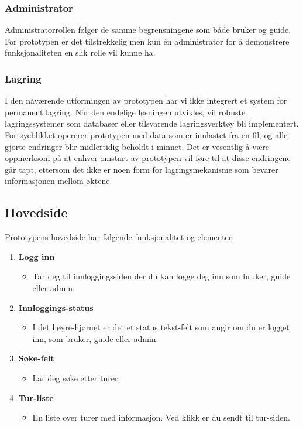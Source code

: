 \documentclass[../doc]{subfiles}
\begin{document}
\subsubsection*{Administrator}
Administratorrollen følger de samme begrensningene som både bruker og guide. For prototypen er det tilstrekkelig men kun én administrator for å demonstrere funksjonaliteten en slik rolle vil kunne ha.

\subsubsection*{Lagring}
I den nåværende utformingen av prototypen har vi ikke integrert et system for permanent lagring. Når den endelige løsningen utvikles, vil robuste lagringssystemer som databaser eller tilsvarende lagringsverktøy bli implementert. For øyeblikket opererer prototypen med data som er innlastet fra en fil, og alle gjorte endringer blir midlertidig beholdt i minnet. Det er vesentlig å være oppmerksom på at enhver omstart av prototypen vil føre til at disse endringene går tapt, ettersom det ikke er noen form for lagringsmekanisme som bevarer informasjonen mellom øktene.

\subsection{Hovedside}
Prototypens hovedside har følgende funksjonalitet og elementer:

\begin{enumerate}
    \item \textbf{Logg inn}
    \begin{itemize}
        \item Tar deg til innloggingssiden der du kan logge deg inn som bruker, guide eller admin.
    \end{itemize}

    \item \textbf{Innloggings-status}
    \begin{itemize}
        \item I det høyre-hjørnet er det et status tekst-felt som angir om du er logget inn, som bruker, guide eller admin.
    \end{itemize}

    \item \textbf{Søke-felt}
    \begin{itemize}
        \item Lar deg søke etter turer.
    \end{itemize}

    \item \textbf{Tur-liste}
    \begin{itemize}
        \item En liste over turer med informasjon. Ved klikk er du sendt til tur-siden.
    \end{itemize}
\end{enumerate}
\end{document}
